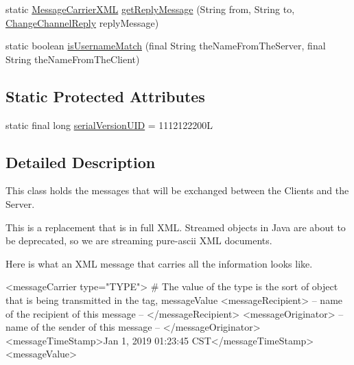 \begin{DoxyCompactItemize}
\item 
static \hyperlink{classgov_1_1fnal_1_1ppd_1_1dd_1_1xml_1_1MessageCarrierXML}{Message\-Carrier\-X\-M\-L} \hyperlink{classgov_1_1fnal_1_1ppd_1_1dd_1_1xml_1_1MessageCarrierXML_ad716b3dd6f81ec1693e0c2b9209b3b83}{get\-Reply\-Message} (String from, String to, \hyperlink{classgov_1_1fnal_1_1ppd_1_1dd_1_1xml_1_1ChangeChannelReply}{Change\-Channel\-Reply} reply\-Message)
\item 
static boolean \hyperlink{classgov_1_1fnal_1_1ppd_1_1dd_1_1xml_1_1MessageCarrierXML_a04d65b843d37b0e9f2e8026ec00b95ff}{is\-Username\-Match} (final String the\-Name\-From\-The\-Server, final String the\-Name\-From\-The\-Client)
\end{DoxyCompactItemize}
\subsection*{Static Protected Attributes}
\begin{DoxyCompactItemize}
\item 
static final long \hyperlink{classgov_1_1fnal_1_1ppd_1_1dd_1_1xml_1_1MessageCarrierXML_addbf53e6678de784e9f2f7a4804c48cf}{serial\-Version\-U\-I\-D} = 1112122200\-L
\end{DoxyCompactItemize}


\subsection{Detailed Description}
This class holds the messages that will be exchanged between the Clients and the Server.

This is a replacement that is in full X\-M\-L. Streamed objects in Java are about to be deprecated, so we are streaming pure-\/ascii X\-M\-L documents.

Here is what an X\-M\-L message that carries all the information looks like.


\begin{DoxyPre}\end{DoxyPre}



\begin{DoxyPre}<messageCarrier type="TYPE"> \# The value of the type is the sort of object that is being transmitted in the tag, messageValue
  <messageRecipient> -- name of the recipient of this message -- </messageRecipient> 
  <messageOriginator> -- name of the sender of this message -- </messageOriginator> 
    <messageTimeStamp>Jan  1, 2019 01:23:45 CST</messageTimeStamp>
  <messageValue>\end{DoxyPre}




